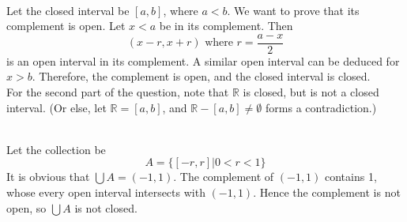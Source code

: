 \begin{solution}
 \\Let the closed interval be $[a,b]$, where $a < b$. We want to prove that its complement is open. Let $x < a$ be in its complement. Then
 $$(x-r,x+r) \text{ where } r = \frac{a-x}{2}$$
 is an open interval in its complement. A similar open interval can be deduced for $x > b$. Therefore, the complement is open, and the closed interval is closed. \\
 For the second part of the question, note that $\mathbb{R}$ is closed, but is not a closed interval. (Or else, let $\mathbb{R} = [a,b]$, and $\mathbb{R}-[a,b] \neq \emptyset$ forms a contradiction.)
\end{solution}


\begin{solution}
 \\Let the collection be
 $$A = \{[-r,r]|0<r<1\}$$
 It is obvious that $\bigcup A = (-1,1)$. The complement of $(-1,1)$ contains 1, whose every open interval intersects with $(-1,1)$. Hence the complement is not open, so $\bigcup A$ is not closed.
\end{solution}

